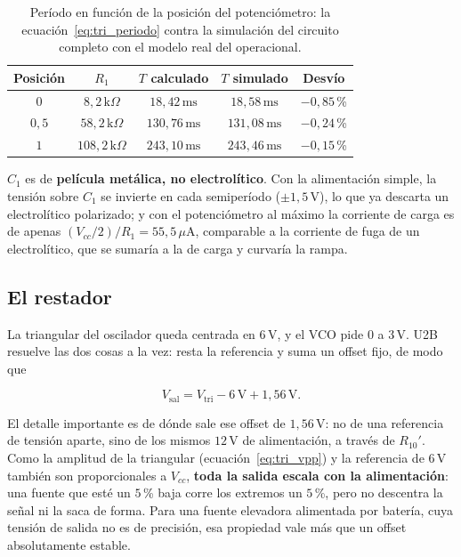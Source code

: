 \documentclass[12pt, a4paper, twoside]{report}
\begin{document}
\begin{table}[H]
  \centering
  \caption{Período en función de la posición del potenciómetro: la
  ecuación~\eqref{eq:tri_periodo} contra la simulación del circuito
  completo con el modelo real del operacional.}
  \label{tab:tri_periodo}
  \begin{tabular}{ccccc}
    \toprule
    Posición & $R_1$ & $T$ calculado & $T$ simulado & Desvío \\
    \midrule
    $0$    & $8{,}2\,\text{k}\Omega$   & $18{,}42\,\text{ms}$  & $18{,}58\,\text{ms}$  & $-0{,}85$\,\% \\
    $0{,}5$& $58{,}2\,\text{k}\Omega$  & $130{,}76\,\text{ms}$ & $131{,}08\,\text{ms}$ & $-0{,}24$\,\% \\
    $1$    & $108{,}2\,\text{k}\Omega$ & $243{,}10\,\text{ms}$ & $243{,}46\,\text{ms}$ & $-0{,}15$\,\% \\
    \bottomrule
  \end{tabular}
\end{table}

$C_1$ es de \textbf{película metálica, no electrolítico}. Con la
alimentación simple, la tensión sobre $C_1$ se invierte en cada
semiperíodo ($\pm 1{,}5\,\text{V}$), lo que ya descarta un electrolítico
polarizado; y con el potenciómetro al máximo la corriente de carga es de
apenas $(V_{cc}/2)/R_1 = 55{,}5\,\mu\text{A}$, comparable a la corriente de
fuga de un electrolítico, que se sumaría a la de carga y curvaría la rampa.

\subsection{El restador}
\label{sub:tri_restador}

La triangular del oscilador queda centrada en $6\,\text{V}$, y el VCO pide
$0$ a $3\,\text{V}$. U2B resuelve las dos cosas a la vez: resta la
referencia y suma un offset fijo, de modo que

\begin{equation}
  V_\text{sal} = V_\text{tri} - 6\,\text{V} + 1{,}56\,\text{V}.
  \label{eq:tri_restador}
\end{equation}

El detalle importante es de dónde sale ese offset de $1{,}56\,\text{V}$: no
de una referencia de tensión aparte, sino de los mismos $12\,\text{V}$ de
alimentación, a través de $R_{10}'$. Como la amplitud de la triangular
(ecuación~\eqref{eq:tri_vpp}) y la referencia de $6\,\text{V}$ también son
proporcionales a $V_{cc}$, \textbf{toda la salida escala con la
alimentación}: una fuente que esté un $5$\,\% baja corre los extremos un
$5$\,\%, pero no descentra la señal ni la saca de forma. Para una fuente
elevadora alimentada por batería, cuya tensión de salida no es de
precisión, esa propiedad vale más que un offset absolutamente estable.
\end{document}
